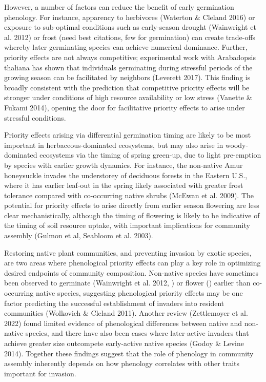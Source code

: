 \documentclass[11pt]{article}
\begin{document}
However, a number of factors can reduce the benefit of early germination phenology. For instance, apparency to herbivores (Waterton \& Cleland 2016) or exposure to sub-optimal conditions such as early-season drought (Wainwright et al. 2012) or frost (need best citations, few for germination) can create trade-offs whereby later germinating species can achieve numerical dominance. Further, priority effects are not always competitive; experimental work with Arabadopsis thaliana has shown that individuals germinating during stressful periods of the growing season can be facilitated by neighbors (Leverett 2017). This finding is broadly consistent with the prediction that competitive priority effects will be stronger under conditions of high resource availability or low stress (Vanette \& Fukami 2014), opening the door for facilitative priority effects to arise under stressful conditions.

Priority effects arising via differential germination timing are likely to be most important in herbaceous-dominated ecosystems, but may also arise in woody-dominated ecosystems via the timing of spring green-up, due to light pre-emption by species with earlier growth dynamics. For instance, the non-native Amur honeysuckle invades the understorey of deciduous forests in the Eastern U.S., where it has earlier leaf-out in the spring likely associated with greater frost tolerance compared with co-occurring native shrubs (McEwan et al. 2009). The potential for priority effects to arise directly from earlier season flowering are less clear mechanistically, although the timing of flowering is likely to be indicative of the timing of soil resource uptake, with important implications for community assembly (Gulmon et al, Seabloom et al. 2003).

Restoring native plant communities, and preventing invasion by exotic species, are two areas where phenological priority effects can play a key role in optimizing desired endpoints of community composition. Non-native species have sometimes been observed to germinate (Wainwright et al. 2012, ) or flower () earlier than co-occurring native species, suggesting phenological priority effects may be one factor predicting the successful establishment of invaders into resident communities (Wolkovich \& Cleland 2011). Another review (Zettlemoyer et al. 2022) found limited evidence of phenological differences between native and non-native species, and there have also been cases where later-active invaders that achieve greater size outcompete early-active native species (Godoy \& Levine 2014). Together these findings suggest that the role of phenology in community assembly inherently depends on how phenology correlates with other traits important for invasion.
\end{document}
